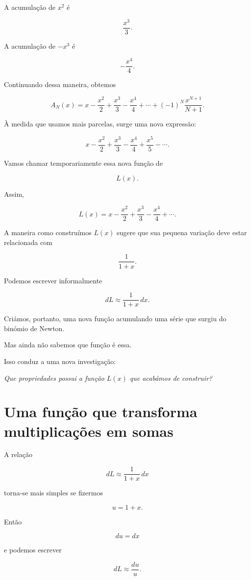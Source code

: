 \documentclass[12pt,a4paper]{article}
\begin{document}
A acumulação de \(x^2\) é

\[
\frac{x^3}{3}.
\]

A acumulação de \(-x^3\) é

\[
-\frac{x^4}{4}.
\]

Continuando dessa maneira, obtemos

\[
A_N(x)
=
x-\frac{x^2}{2}
+\frac{x^3}{3}
-\frac{x^4}{4}
+\cdots+
(-1)^N\frac{x^{N+1}}{N+1}.
\]

À medida que usamos mais parcelas, surge uma nova expressão:

\[
x-\frac{x^2}{2}
+\frac{x^3}{3}
-\frac{x^4}{4}
+\frac{x^5}{5}
-\cdots.
\]

Vamos chamar temporariamente essa nova função de

\[
L(x).
\]

Assim,

\[
L(x)
=
x-\frac{x^2}{2}
+\frac{x^3}{3}
-\frac{x^4}{4}
+\cdots.
\]

A maneira como construímos \(L(x)\) sugere que sua pequena variação deve
estar relacionada com

\[
\frac{1}{1+x}.
\]

Podemos escrever informalmente

\[
dL
\approx
\frac{1}{1+x}\,dx.
\]

Criámos, portanto, uma nova função acumulando uma série que surgiu do
binómio de Newton.

Mas ainda não sabemos que função é essa.

Isso conduz a uma nova investigação:

\begin{center}
\emph{Que propriedades possui a função \(L(x)\) que acabámos de
construir?}
\end{center}

\section{Uma função que transforma multiplicações em somas}

A relação

\[
dL
\approx
\frac{1}{1+x}\,dx
\]

torna-se mais simples se fizermos

\[
u=1+x.
\]

Então

\[
du=dx
\]

e podemos escrever

\[
dL
\approx
\frac{du}{u}.
\]
\end{document}
